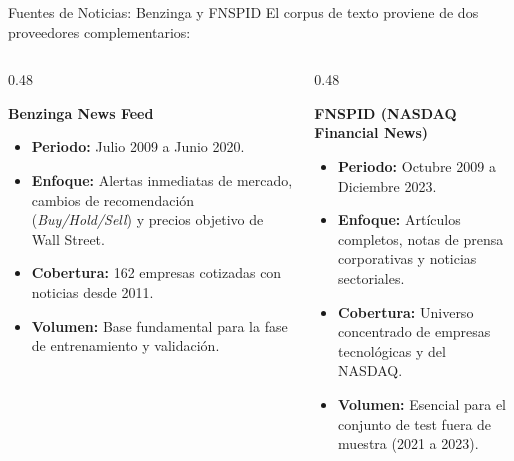 \documentclass[aspectratio=169,11pt]{beamer}
\begin{document}
\begin{frame}{Fuentes de Noticias: Benzinga y FNSPID}
    El corpus de texto proviene de dos proveedores complementarios:
    \vspace{0.3cm}
    
    \begin{columns}[T]
        \begin{column}{0.48\textwidth}
            \begin{block}{\textbf{Benzinga News Feed}}
                \begin{itemize}
                    \item \textbf{Periodo:} Julio 2009 a Junio 2020.
                    \item \textbf{Enfoque:} Alertas inmediatas de mercado, cambios de recomendación (\textit{Buy/Hold/Sell}) y precios objetivo de Wall Street.
                    \item \textbf{Cobertura:} 162 empresas cotizadas con noticias desde 2011.
                    \item \textbf{Volumen:} Base fundamental para la fase de entrenamiento y validación.
                \end{itemize}
            \end{block}
        \end{column}
        
        \begin{column}{0.48\textwidth}
            \begin{block}{\textbf{FNSPID (NASDAQ Financial News)}}
                \begin{itemize}
                    \item \textbf{Periodo:} Octubre 2009 a Diciembre 2023.
                    \item \textbf{Enfoque:} Artículos completos, notas de prensa corporativas y noticias sectoriales.
                    \item \textbf{Cobertura:} Universo concentrado de empresas tecnológicas y del NASDAQ.
                    \item \textbf{Volumen:} Esencial para el conjunto de test fuera de muestra (2021 a 2023).
                \end{itemize}
            \end{block}
        \end{column}
    \end{columns}
\end{frame}
\end{document}
